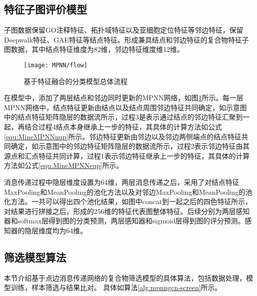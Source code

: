 \subsection{特征子图评价模型}
子图数据保留GO注释特征、拓扑域特征以及亚细胞定位特征等邻边特征，保留Deepwalk特征、GAE特征等结点特征。形成兼具结点和邻边特征的复合物特征子图数据，其中结点特征维度为82维，邻边特征维度维12维。

\begin{figure}[htbp]
    \centering
    \texttt{[image: MPNN/flow]}
    \caption{基于特征融合的分类模型总体流程}
    \label{fig:MPNN/flow}
\end{figure}

在模型中，添加了两层结点和邻边同时更新的MPNN网络，如图\ref{fig:MPNN/flow}所示。每一层MPNN网络中，结点特征更新由结点以及结点周围邻边特征共同确定，如示意图中的结点特征矩阵隐层的数据流所示，过程3是表示通过结点的邻边特征汇聚到一起，再结合过程4结点本身继承上一步的特征，其具体的计算方法如公式\ref{equ:MineMPNNnup}所示。邻边特征更新由邻边以及邻边两侧端点的结点特征共同确定，如示意图中的邻边特征矩阵隐层的数据流所示，过程2表示邻边特征由其源点和汇点特征共同计算，过程1表示邻边特征继承上一步的特征，其具体的计算方法如公式\ref{equ:MineMPNNeup}所示。

消息传递过程中隐层维度设置为64维，两层消息传递之后，采用了对结点特征MaxPooling和MeanPooling的池化方法以及对邻边MaxPooling和MeanPooling的池化方法。一共可以得出四个池化结果，如图中concat到一起之后的四色特征所示，对结果进行拼接之后，形成的256维的特征代表图整体特征。后续分别为两层感知器和softmax层得到图的分类预测，两层感知器和sigmoid层得到图的评分预测。感知器的隐层维度均为64维。

\subsection{筛选模型算法}
本节介绍基于点边消息传递网络的复合物筛选模型的具体算法，包括数据处理，模型训练，样本筛选与结果比对。
具体如算法\ref{alg:mpnngcn-screen}所示。

